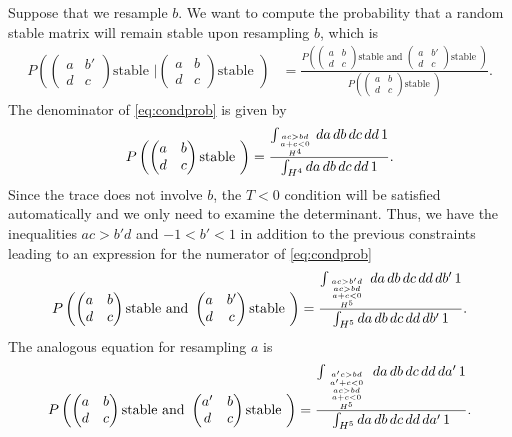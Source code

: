 \documentclass{amsart}
\theoremstyle{definition}
\theoremstyle{remark}
\numberwithin{equation}{section}
\begin{document}
Suppose that we resample $b$.  We want to compute the probability that a random stable matrix will remain stable upon resampling $b$, which is
\begin{align}\label{eq:condprob}
P\left(\begin{pmatrix}
a & b' \\
d & c
\end{pmatrix} \textrm{stable } \bigg| \begin{pmatrix}
a & b \\
d & c
\end{pmatrix} \textrm{stable } \right)
& = \frac{P\left(\begin{pmatrix}
a & b \\
d & c
\end{pmatrix} \textrm{stable and } \begin{pmatrix}
a & b' \\
d & c
\end{pmatrix} \textrm{stable } \right)}{P\left(\begin{pmatrix}
a & b \\
d & c
\end{pmatrix} \textrm{stable } \right)}.
\end{align}
The denominator of \ref{eq:condprob} is given by
\begin{align*}
P\left(\begin{pmatrix}
a & b \\
d & c
\end{pmatrix} \textrm{stable } \right) = \frac{\int_{{ac>bd \atop a+c<0} \atop H^4} da\,db\,dc\,dd\,1}{\int_{H^4} da\,db\,dc\,dd\,1}.
\end{align*}
Since the trace does not involve $b$, the $T<0$ condition will be satisfied automatically and we only need to examine the determinant. Thus, we have the inequalities $ac > b'd$ and $-1 < b' < 1$ in addition to the previous constraints leading to an expression for the numerator of \ref{eq:condprob}
\begin{align*}
P\left(\begin{pmatrix}
a & b \\
d & c
\end{pmatrix} \textrm{stable and } \begin{pmatrix}
a & b' \\
d & c
\end{pmatrix} \textrm{stable } \right) = \frac{\int_{{{ac>b'd \atop ac>bd} \atop a+c<0} \atop H^5} da\,db\,dc\,dd\,db'\,1}{\int_{H^5} da\,db\,dc\,dd\,db'\,1}.
\end{align*}
The analogous equation for resampling $a$ is
\begin{align*}
P\left(\begin{pmatrix}
a & b \\
d & c
\end{pmatrix} \textrm{stable and } \begin{pmatrix}
a' & b \\
d & c
\end{pmatrix} \textrm{stable } \right) = \frac{\int_{{{{a'c>bd \atop a' + c < 0} \atop ac>bd} \atop a+c<0} \atop H^5} da\,db\,dc\,dd\,da'\,1}{\int_{H^5} da\,db\,dc\,dd\,da'\,1}.
\end{align*}
\end{document}

